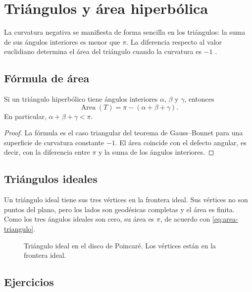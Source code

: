 \chapter{Triángulos y área hiperbólica}
\label{cap:triangulos-hiperbolicos}

La curvatura negativa se manifiesta de forma sencilla en los triángulos: la suma de sus ángulos interiores es menor que \(\pi\). La diferencia respecto al valor euclidiano determina el área del triángulo cuando la curvatura es \(-1\) \cite{anderson2005,greenberg2008}.

\section{Fórmula de área}

\begin{theorem}
Si un triángulo hiperbólico tiene ángulos interiores \(\alpha\), \(\beta\) y \(\gamma\), entonces
\begin{equation}
  \operatorname{Area}(T)=\pi-(\alpha+\beta+\gamma).
  \label{eq:area-triangulo}
\end{equation}
En particular, \(\alpha+\beta+\gamma<\pi\).
\end{theorem}

\begin{proof}
La fórmula es el caso triangular del teorema de Gauss--Bonnet para una superficie de curvatura constante \(-1\). El área coincide con el defecto angular, es decir, con la diferencia entre \(\pi\) y la suma de los ángulos interiores.
\end{proof}

\section{Triángulos ideales}

Un triángulo ideal tiene sus tres vértices en la frontera ideal. Sus vértices no son puntos del plano, pero los lados son geodésicas completas y el área es finita. Como los tres ángulos ideales son cero, su área es \(\pi\), de acuerdo con \cref{eq:area-triangulo}.

\begin{figure}[htbp]
  \centering
  
  \caption{Triángulo ideal en el disco de Poincaré. Los vértices están en la frontera ideal.}
  \label{fig:triangulo-ideal}
\end{figure}

\section{Ejercicios}

